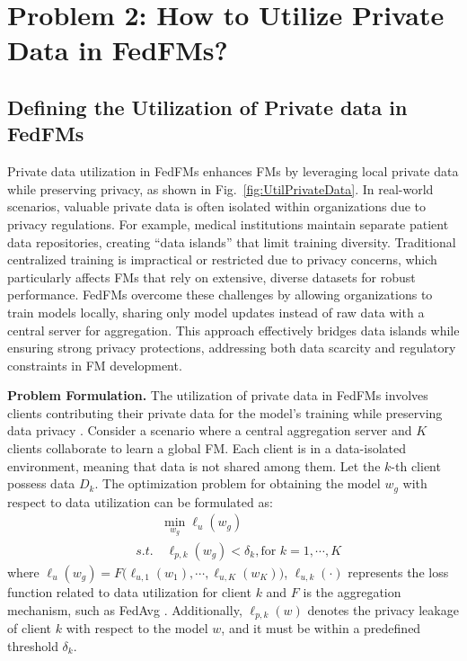\section{Problem 2: How to Utilize Private Data in FedFMs?}

\subsection{Defining the Utilization of Private data in FedFMs}
Private data utilization in FedFMs enhances FMs by leveraging local private data while preserving privacy, as shown in Fig.~\ref{fig:UtilPrivateData}. In real-world scenarios, valuable private data is often isolated within organizations due to privacy regulations. For example, medical institutions maintain separate patient data repositories, creating “data islands” that limit training diversity. Traditional centralized training is impractical or restricted due to privacy concerns, which particularly affects FMs that rely on extensive, diverse datasets for robust performance. FedFMs overcome these challenges by allowing organizations to train models locally, sharing only model updates instead of raw data with a central server for aggregation. This approach effectively bridges data islands while ensuring strong privacy protections, addressing both data scarcity and regulatory constraints in FM development.


\textbf{Problem Formulation.} The utilization of private data in FedFMs involves clients contributing their private data for the model's training while preserving data privacy \cite{mcmahan2017communication,yang2019federated, 6-data-datasetgrouper}.
Consider a scenario where a central aggregation server and $K$ clients collaborate to learn a global FM. Each client is in a data-isolated environment, meaning that data is not shared among them. Let the $k$-th client possess data $D_k$. 
The optimization problem for obtaining the model $w_g$ with respect to data utilization can be formulated as:
\begin{equation}
    \begin{split}
       &\qquad \min_{w_g}\ell_u(w_g) \\
       & s.t.\quad \ell_{p,k}(w_g)<\delta_k, \text{for }k=1,\cdots,K
    \end{split}
\end{equation}
where $\ell_u(w_g) = F\Big(\ell_{u,1}(w_1), \cdots, {\ell}_{u,K}(w_K)\Big)$, $\ell_{u,k}(\cdot)$ represents the loss function related to data utilization for client $k$ and $F$ is the aggregation mechanism, such as FedAvg \cite{mcmahan2017communication}.  Additionally, $\ell_{p,k}(w)$ denotes the privacy leakage of client $k$ with respect to the model $w$, and it must be within a predefined threshold $\delta_k$.

